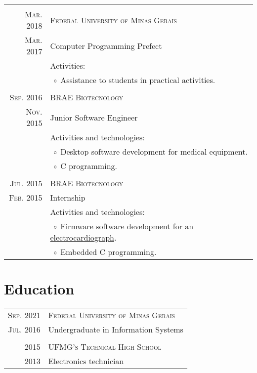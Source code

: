 \documentclass[a4paper,10pt]{article}
\newcommand{\tabitem}{$\;\circ\;$}
\renewcommand\#{\protect\scalebox{0.8}{\protect\raisebox{0.4ex}{\char"0023}}}
\begin{document}
\begin{tabular}{r|p{12.3cm}}
  \multicolumn{2}{c}{} \\
  \textsc{Mar. 2018} & \textsc{Federal University of Minas Gerais} \\
  \textsc{Mar. 2017} & Computer Programming Prefect \\[5pt]
  & Activities: \\
  & \tabitem Assistance to students in practical activities. \\
  
  \multicolumn{2}{c}{} \\
  \textsc{Sep. 2016} & \textsc{BRAE Biotecnology} \\
  \textsc{Nov. 2015} & Junior Software Engineer \\[5pt]
  & Activities and technologies: \\
  & \tabitem Desktop software development for medical equipment.\\
  & \tabitem C\# programming. \\
  
  \multicolumn{2}{c}{} \\
  \textsc{Jul. 2015} & \textsc{BRAE Biotecnology} \\
  \textsc{Feb. 2015} & Internship \\[5pt]
  & Activities and technologies: \\
  & \tabitem Firmware software development for an \href{http://www.ferox.vet.br/pt-br/produtos/ecg-veterinario.aspx}{electrocardiograph}. \\
  & \tabitem Embedded C programming.
\end{tabular}


\section{Education}
\begin{tabular}{r|l}
  \textsc{Sep. 2021} & \textsc{Federal University of Minas Gerais} \\
  \textsc{Jul. 2016} & Undergraduate in Information Systems \\
  
  \multicolumn{2}{c}{} \\
  \textsc{2015} & \textsc{UFMG's Technical High School} \\
  \textsc{2013} & Electronics technician \\
\end{tabular}
\end{document}
